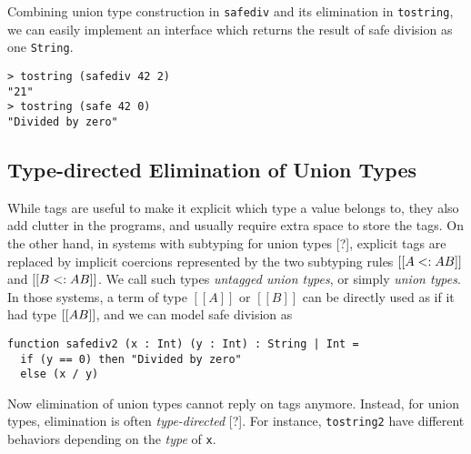 Combining union type construction in \lstinline{safediv} and its elimination in
\lstinline{tostring}, we can easily implement an interface which returns the
result of safe division as one \lstinline{String}.

\begin{lstlisting}
> tostring (safediv 42 2)
"21"
> tostring (safe 42 0)
"Divided by zero"
\end{lstlisting}


\subsection{Type-directed Elimination of Union Types}





While tags are useful to make it explicit which type a value belongs to, they
also add clutter in the programs, and usually require extra space to store the tags. On
the other hand, in systems with subtyping for union types [?], explicit tags are
replaced by implicit coercions represented by the two subtyping rules $[[A <: A \/
B]]$ and $[[B <: A \/ B]]$. We call such types \textit{untagged union types}, or
simply \textit{union types}. In those systems, a term of type $[[A]]$ or $[[B]]$
can be directly used as if it had type $[[A \/ B]]$, and we can model safe
division as

\begin{lstlisting}
function safediv2 (x : Int) (y : Int) : String | Int =
  if (y == 0) then "Divided by zero"
  else (x / y)
\end{lstlisting}

Now elimination of union types cannot reply on tags anymore. Instead, for
union types, elimination is often \textit{type-directed} [?]. For instance,
\lstinline{tostring2} have different behaviors depending on the \textit{type} of
\lstinline{x}.

